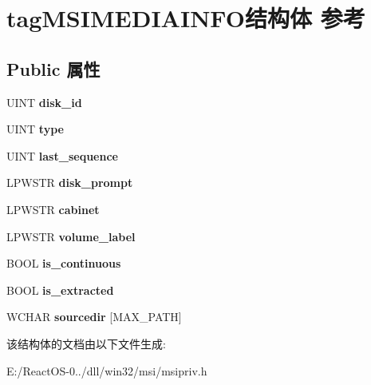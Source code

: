 \hypertarget{structtag_m_s_i_m_e_d_i_a_i_n_f_o}{}\section{tag\+M\+S\+I\+M\+E\+D\+I\+A\+I\+N\+F\+O结构体 参考}
\label{structtag_m_s_i_m_e_d_i_a_i_n_f_o}
\subsection*{Public 属性}
\begin{DoxyCompactItemize}
\item 
\mbox{\label{structtag_m_s_i_m_e_d_i_a_i_n_f_o_a18afa8de4317ab785eaf2fdd109ecbae}} 
U\+I\+NT {\bfseries disk\+\_\+id}
\item 
\mbox{\label{structtag_m_s_i_m_e_d_i_a_i_n_f_o_aeeb495c76244031a335e55e2561eacc5}} 
U\+I\+NT {\bfseries type}
\item 
\mbox{\label{structtag_m_s_i_m_e_d_i_a_i_n_f_o_a03d837453bee29019f2e2e8e2183ec4d}} 
U\+I\+NT {\bfseries last\+\_\+sequence}
\item 
\mbox{\label{structtag_m_s_i_m_e_d_i_a_i_n_f_o_ae8955d19722b97341959df95bc48e92d}} 
L\+P\+W\+S\+TR {\bfseries disk\+\_\+prompt}
\item 
\mbox{\label{structtag_m_s_i_m_e_d_i_a_i_n_f_o_a1de45209bf1da6e898a5f97d40cd6f36}} 
L\+P\+W\+S\+TR {\bfseries cabinet}
\item 
\mbox{\label{structtag_m_s_i_m_e_d_i_a_i_n_f_o_a039e1a1f05bbd22cde7ffd53b99b24c2}} 
L\+P\+W\+S\+TR {\bfseries volume\+\_\+label}
\item 
\mbox{\label{structtag_m_s_i_m_e_d_i_a_i_n_f_o_adda515d47b7403511c0b5fa92440e946}} 
B\+O\+OL {\bfseries is\+\_\+continuous}
\item 
\mbox{\label{structtag_m_s_i_m_e_d_i_a_i_n_f_o_aca5747259b907f7ef0ee1ca5d4a87a9b}} 
B\+O\+OL {\bfseries is\+\_\+extracted}
\item 
\mbox{\label{structtag_m_s_i_m_e_d_i_a_i_n_f_o_aa367dcf2f81a779a8f65a5694d12ad0a}} 
W\+C\+H\+AR {\bfseries sourcedir} \mbox{[}M\+A\+X\+\_\+\+P\+A\+TH\mbox{]}
\end{DoxyCompactItemize}


该结构体的文档由以下文件生成\+:\begin{DoxyCompactItemize}
\item 
E\+:/\+React\+O\+S-\/0../dll/win32/msi/msipriv.\+h\end{DoxyCompactItemize}

